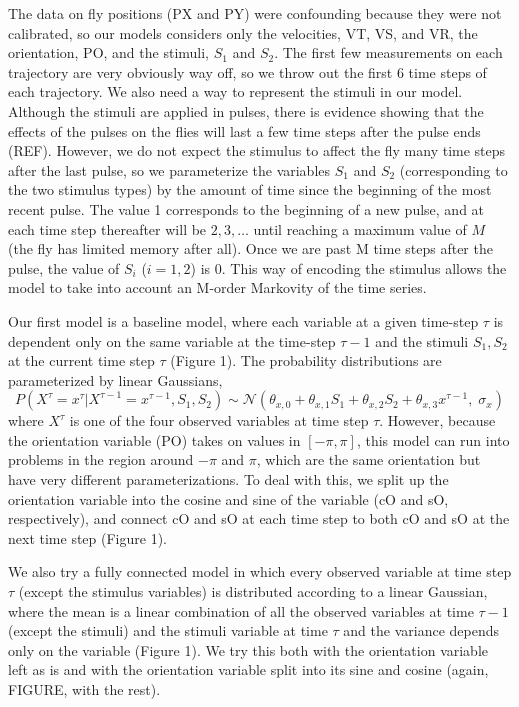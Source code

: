 \documentclass{article} %
\begin{document}
The data on fly positions (PX and PY) were confounding because they were not calibrated, so our models considers only the velocities, VT, VS, and VR, the orientation, PO, and the stimuli, $S_1$ and $S_2$. The first few measurements on each trajectory are very obviously way off, so we throw out the first 6 time steps of each trajectory. We also need a way to represent the stimuli in our model. Although the stimuli are applied in pulses, there is evidence showing that the effects of the pulses on the flies will last a few time steps after the pulse ends (REF). However, we do not expect the stimulus to affect the fly many time steps after the last pulse, so we parameterize the variables $S_1$ and $S_2$ (corresponding to the two stimulus types) by the amount of time since the beginning of the most recent pulse. The value 1 corresponds to the beginning of a new pulse, and at each time step thereafter will be $2, 3, \ldots$ until reaching a maximum value of $M$ (the fly has limited memory after all). Once we are past M time steps after the pulse, the value of $S_i$ ($i=1,2$) is $0$. This way of encoding the stimulus allows the model to take into account an M-order Markovity of the time series.

Our first model is a baseline model, where each variable at a given time-step $\tau$ is dependent only on the same variable at the time-step $\tau-1$ and the stimuli $S_1, S_2$ at the current time step $\tau$ (Figure 1). The probability distributions are parameterized by linear Gaussians,
$$
P(X^{\tau} = x^{\tau} | X^{\tau-1}=x^{\tau-1}, S_1, S_2) \sim \mathcal{N}\left( \theta_{x,0} + \theta_{x,1}S_1 + \theta_{x,2}S_2 + \theta_{x,3}x^{\tau-1}, \; \sigma_x \right)
$$
where $X^{\tau}$ is one of the four observed variables at time step $\tau$.
However, because the orientation variable (PO) takes on values in $[-\pi,\pi]$, this model can run into problems in the region around $-\pi$ and $\pi$, which are the same orientation but have very different parameterizations. To deal with this, we split up the orientation variable into the cosine and sine of the variable (cO and sO, respectively), and connect cO and sO at each time step to both cO and sO at the next time step (Figure 1).

We also try a fully connected model in which every observed variable at time step $\tau$ (except the stimulus variables) is distributed according to a linear Gaussian, where the mean is a linear combination of all the observed variables at time $\tau-1$ (except the stimuli) and the stimuli variable at time $\tau$ and the variance depends only on the variable (Figure 1). We try this both with the orientation variable left as is and with the orientation variable split into its sine and cosine (again, FIGURE, with the rest).
\end{document}
